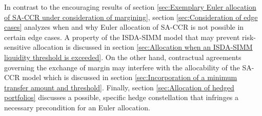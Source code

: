 \documentclass[../Thesis_AHoecherl.tex]{subfiles}
\begin{document}
    In contrast to the encouraging results of section \ref{sec:Exemplary Euler allocation of SA-CCR under consideration of margining}, section \ref{sec:Consideration of edge cases} analyzes when and why Euler allocation of SA-CCR is not possible in certain edge cases.
    A property of the ISDA-SIMM model that may prevent risk-sensitive allocation is discussed in section \ref{sec:Allocation when an ISDA-SIMM liquidity threshold is exceeded}. 
    On the other hand, contractual agreements governing the exchange of margin may interfere with the allocability of the SA-CCR model which is discussed in section \ref{sec:Incorporation of a minimum transfer amount and threshold}.
    Finally, section \ref{sec:Allocation of hedged portfolios} discusses a possible, specific hedge constellation that infringes a necessary precondition for an Euler allocation.



\end{document}

